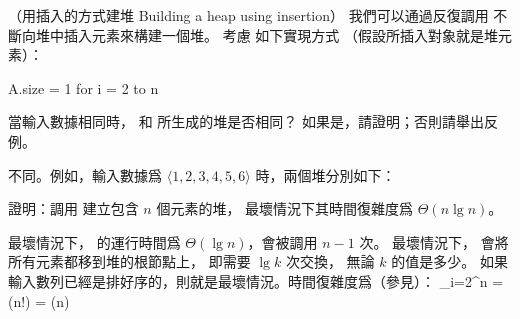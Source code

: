 \startPROBLEM
（用插入的方式建堆 Building a heap using insertion）
我們可以通過反復調用  不斷向堆中插入元素來構建一個堆。
考慮  如下實現方式
（假設所插入對象就是堆元素）：

\startCLRSCODE
A.size = 1
for i = 2 to n
\stopCLRSCODE

\startigBase[a]\startitem
當輸入數據相同時，  和  所生成的堆是否相同？
如果是，請證明；否則請舉出反例。
\stopitem\stopigBase

\startANSWER
不同。例如，輸入數據爲 $\langle 1, 2, 3, 4, 5, 6 \rangle$ 時，兩個堆分別如下：

\startcombination[2*1]
{\externalfigure[p6_1_a-1]}{}
{\externalfigure[p6_1_a-2]}{}
\stopcombination
\stopANSWER

\startigBase[continue]\startitem
證明：調用  建立包含 $n$ 個元素的堆，
最壞情況下其時間復雜度爲 $\Theta(n\lg{n})$。
\stopitem\stopigBase

\startANSWER
最壞情況下，  的運行時間爲 $\Theta(\lg{n})$，會被調用 $n-1$ 次。
最壞情況下，  會將所有元素都移到堆的根節點上， 即需要 $\lg{k}$ 次交換，
無論 $k$ 的值是多少。
如果輸入數列已經是排好序的，則就是最壞情況。時間復雜度爲（參見\inexercise[lg_n_fac]）：
\startformula
\sum_{i=2}^{n} = \lg(n!) = \Theta(n)
\stopformula
\stopANSWER

\stopPROBLEM
